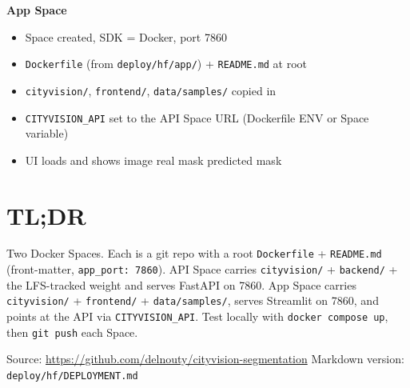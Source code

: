 \documentclass[11pt]{article}
\newcommand{\code}[1]{\lstinline[basicstyle=\ttfamily\normalsize]|#1|}
\begin{document}
\noindent\textbf{App Space}
\begin{itemize}[label=$\square$]
  \item Space created, SDK = Docker, port 7860
  \item \code{Dockerfile} (from \code{deploy/hf/app/}) + \code{README.md} at root
  \item \code{cityvision/}, \code{frontend/}, \code{data/samples/} copied in
  \item \code{CITYVISION_API} set to the API Space URL (Dockerfile ENV or Space
    variable)
  \item UI loads and shows image \textperiodcentered{} real mask
    \textperiodcentered{} predicted mask
\end{itemize}

\section*{TL;DR}
Two Docker Spaces. Each is a git repo with a root \code{Dockerfile} +
\code{README.md} (front-matter, \code{app_port: 7860}). API Space carries
\code{cityvision/} + \code{backend/} + the LFS-tracked weight and serves FastAPI on
7860. App Space carries \code{cityvision/} + \code{frontend/} + \code{data/samples/},
serves Streamlit on 7860, and points at the API via \code{CITYVISION_API}. Test
locally with \code{docker compose up}, then \code{git push} each Space.

\vfill
\noindent\footnotesize\color{rulegray}
Source: \url{https://github.com/delnouty/cityvision-segmentation} \quad\textbar\quad
Markdown version: \code{deploy/hf/DEPLOYMENT.md}
\end{document}
